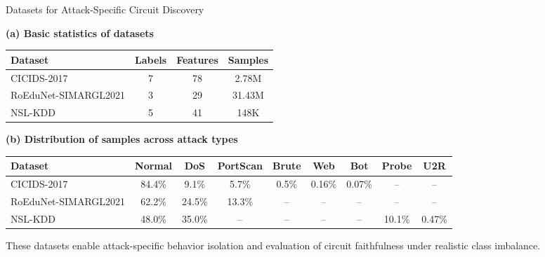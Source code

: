 \documentclass{beamer}
\begin{document}
	\begin{frame}{Datasets for Attack-Specific Circuit Discovery}
		\footnotesize
		\centering
		
		\textbf{(a) Basic statistics of datasets}
		
		\vspace{0.25cm}
		\begin{tabular}{lccc}
			\toprule
			\textbf{Dataset} &
			\textbf{Labels} &
			\textbf{Features} &
			\textbf{Samples} \\
			\midrule
			CICIDS-2017 & 7 & 78 & 2.78M \\
			RoEduNet-SIMARGL2021 & 3 & 29 & 31.43M \\
			NSL-KDD & 5 & 41 & 148K \\
			\bottomrule
		\end{tabular}
		
		\vspace{0.5cm}
		
		\textbf{(b) Distribution of samples across attack types}
		\vspace{0.5cm}
		\tiny
		\begin{tabular}{lcccccccc}
			\toprule
			\textbf{Dataset} &
			\textbf{Normal} &
			\textbf{DoS} &
			\textbf{PortScan} &
			\textbf{Brute} &
			\textbf{Web} &
			\textbf{Bot} &
			\textbf{Probe} &
			\textbf{U2R} \\
			\midrule
			CICIDS-2017 &
			84.4\% & 9.1\% & 5.7\% & 0.5\% & 0.16\% & 0.07\% & -- & -- \\
			
			RoEduNet-SIMARGL2021 &
			62.2\% & 24.5\% & 13.3\% & -- & -- & -- & -- & -- \\
			
			NSL-KDD &
			48.0\% & 35.0\% & -- & -- & -- & -- & 10.1\% & 0.47\% \\
			\bottomrule
		\end{tabular}
		
		\vspace{0.3cm}
		{\scriptsize
			These datasets enable attack-specific behavior isolation and evaluation
			of circuit faithfulness under realistic class imbalance.
		}
	\end{frame}
	
\end{document}
